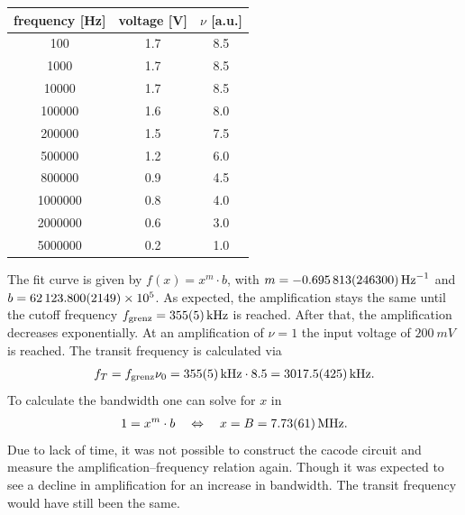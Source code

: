 \documentclass[a4paper,10pt]{article}
\newenvironment{Figure}
  {\par\medskip\noindent\minipage{\linewidth}}
  {\endminipage\par\medskip} %
\numberwithin{equation}{section}
\begin{document}
\begin{multicols}{2}
\begin{Figure}
		 \label{plot:bode}
	\end{Figure}
	\begin{center}
		\begin{tabular}{|c|c|c|}
			\hline
			frequency [Hz] & voltage [V] & $\nu$ [a.u.] \\
			\hline
			100            & 1.7         & 8.5          \\
			1000           & 1.7         & 8.5          \\
			10000          & 1.7         & 8.5          \\
			100000         & 1.6         & 8.0          \\
			200000         & 1.5         & 7.5          \\
			500000         & 1.2         & 6.0          \\
			800000         & 0.9         & 4.5          \\
			1000000        & 0.8         & 4.0          \\
			2000000        & 0.6         & 3.0          \\
			5000000        & 0.2         & 1.0          \\
			\hline
		\end{tabular}
	\end{center}
	The fit curve is given by $f\left(x\right)=x^m\cdot b$, with $m=\SI{-0.695813+-0.2463}{Hz^{-1}}$ and $b=\SI{62123.8+-2.149e+05}{}$.
	As expected, the amplification stays the same until the cutoff frequency $f_\text{grenz}=\SI{355+-5}{kHz}$ is reached.
	After that, the amplification decreases exponentially.
	At an amplification of $\nu =1$ the input voltage of $\SI{200}{mV}$ is reached.
	The transit frequency is calculated via
	\begin{align}
		f_T=f_\text{grenz}\nu _0=\SI{355+-5}{kHz}\cdot 8.5=\SI{3017.5+-42.5}{kHz}
		.\end{align}
	To calculate the bandwidth one can solve for $x$ in
	\begin{align}
		1=x^{m}\cdot b\quad \Leftrightarrow \quad x=B=\SI{7.73+-0.61}{MHz}
		.\end{align}
	Due to lack of time, it was not possible to construct the cacode circuit and measure the amplification--frequency relation again.
	Though it was expected to see a decline in amplification for an increase in bandwidth.
	The transit frequency would have still been the same.


\end{multicols}
\end{document}
